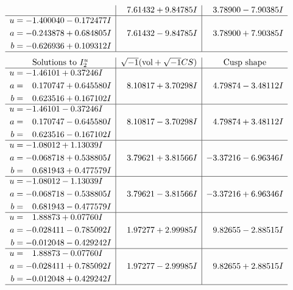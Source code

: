 \documentclass[1p]{elsarticle_modified}
\theoremstyle{definition}
\newcommand{\I}{\sqrt{-1}}
\begin{document}
$$\begin{array}{c|c|c}
 & \phantom{-}7.61432 + 9.84785 I & \phantom{-}3.78900 - 7.90385 I \\ \hline\begin{aligned}
u &= -1.400040 - 0.172477 I \\
a &= -0.243878 + 0.684805 I \\
b &= -0.626936 + 0.109312 I\end{aligned}
 & \phantom{-}7.61432 - 9.84785 I & \phantom{-}3.78900 + 7.90385 I\\
 \hline 
 \end{array}$$\newpage$$\begin{array}{c|c|c}  
\text{Solutions to }I^u_{2}& \I (\text{vol} + \sqrt{-1}CS) & \text{Cusp shape}\\
 \hline 
\begin{aligned}
u &= -1.46101 + 0.37246 I \\
a &= \phantom{-}0.170747 + 0.645580 I \\
b &= \phantom{-}0.623516 + 0.167102 I\end{aligned}
 & \phantom{-}8.10817 + 3.70298 I & \phantom{-}4.79874 - 3.48112 I \\ \hline\begin{aligned}
u &= -1.46101 - 0.37246 I \\
a &= \phantom{-}0.170747 - 0.645580 I \\
b &= \phantom{-}0.623516 - 0.167102 I\end{aligned}
 & \phantom{-}8.10817 - 3.70298 I & \phantom{-}4.79874 + 3.48112 I \\ \hline\begin{aligned}
u &= -1.08012 + 1.13039 I \\
a &= -0.068718 + 0.538805 I \\
b &= \phantom{-}0.681943 + 0.477579 I\end{aligned}
 & \phantom{-}3.79621 + 3.81566 I & -3.37216 - 6.96346 I \\ \hline\begin{aligned}
u &= -1.08012 - 1.13039 I \\
a &= -0.068718 - 0.538805 I \\
b &= \phantom{-}0.681943 - 0.477579 I\end{aligned}
 & \phantom{-}3.79621 - 3.81566 I & -3.37216 + 6.96346 I \\ \hline\begin{aligned}
u &= \phantom{-}1.88873 + 0.07760 I \\
a &= -0.028411 - 0.785092 I \\
b &= -0.012048 - 0.429242 I\end{aligned}
 & \phantom{-}1.97277 + 2.99985 I & \phantom{-}9.82655 - 2.88515 I \\ \hline\begin{aligned}
u &= \phantom{-}1.88873 - 0.07760 I \\
a &= -0.028411 + 0.785092 I \\
b &= -0.012048 + 0.429242 I\end{aligned}
 & \phantom{-}1.97277 - 2.99985 I & \phantom{-}9.82655 + 2.88515 I\\
 \hline 
 \end{array}$$\newpage\newpage\renewcommand{\arraystretch}{1}
\end{document}
